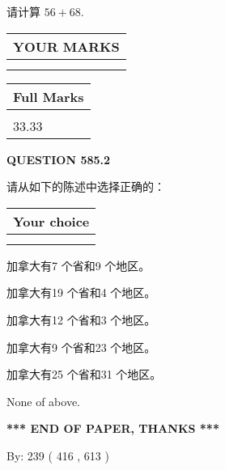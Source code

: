 \documentclass{ctexart}
\begin{document}
  
 
请计算 $ %
56 +  %
68 $.
 

 

 
  
\vspace{0.2in}
  
\noindent\begin{tabular}{|l|}
\hline
 YOUR MARKS  \\
\hline
 \\ 
 \\ 
\hline
\end{tabular}
\hspace{0.05in} \begin{tabular}{|l|}
\hline
 Full Marks  \\
\hline
 \\ 
33.33 \\
\hline
\end{tabular}
{\textbf{\Large{QUESTION
585.2 
}}}
  
  
请从如下的陈述中选择正确的：
  
  
\noindent\hspace{3.0in} \begin{tabular}{|l|}
\hline
Your choice \\
\hline
 \\ 
 \\ 
\hline
\end{tabular}
  
  
 
 
加拿大有7 个省和9 个地区。
 
 
加拿大有19 个省和4 个地区。
 
 
加拿大有12 个省和3 个地区。
 
 
加拿大有9 个省和23 个地区。
 
 
加拿大有25 个省和31 个地区。
 
 
 None of above.
 
 
   
   
 \vspace{0.2in}
 
   
   
   
   
\vspace{1.0in} 
{\textbf{\large{ *** END OF PAPER, THANKS *** }}} 
   
   
\hspace{1.0in} By: 
 239 ( 416 ,  613 )
   
\end{document}

